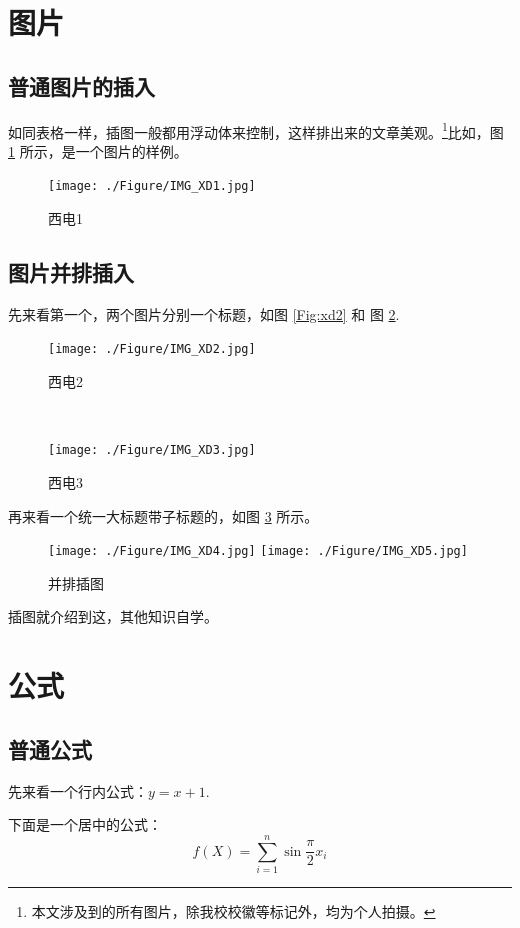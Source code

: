 \section{图片}
\subsection{普通图片的插入}
如同表格一样，插图一般都用浮动体来控制，这样排出来的文章美观。\footnote{本文涉及到的所有图片，除我校校徽等标记外，均为个人拍摄。}比如，图 \ref{Fig:xd1} 所示，是一个图片的样例。
\begin{figure}[ht]
  \centering
  \texttt{[image: ./Figure/IMG\_XD1.jpg]}
  \caption{西电1}\label{Fig:xd1}
\end{figure}

\subsection{图片并排插入}

先来看第一个，两个图片分别一个标题，如图 \ref{Fig:xd2} 和 图 \ref{Fig:xd3}.
\begin{figure}[ht]
\centering
\begin{minipage}{.45\textwidth}
\centering
\texttt{[image: ./Figure/IMG\_XD2.jpg]}
  \caption{西电2}\label{Fig:xd2}
\end{minipage}~
\begin{minipage}{.45\textwidth}
\centering
\texttt{[image: ./Figure/IMG\_XD3.jpg]}
  \caption{西电3}\label{Fig:xd3}
\end{minipage}
\end{figure}

再来看一个统一大标题带子标题的，如图 \ref{Fig:bingpai} 所示。
\begin{figure}[ht]
\centering
{}
{\texttt{[image: ./Figure/IMG\_XD4.jpg]}}
{\texttt{[image: ./Figure/IMG\_XD5.jpg]}}
\caption{并排插图}\label{Fig:bingpai}
\end{figure}

插图就介绍到这，其他知识自学。

\section{公式}
\subsection{普通公式}
先来看一个行内公式：$y=x+1$.

下面是一个居中的公式：
\[
f(X)=\sum_{i=1}^{n}\sin{\frac{\pi}{2}x_i}
\]

